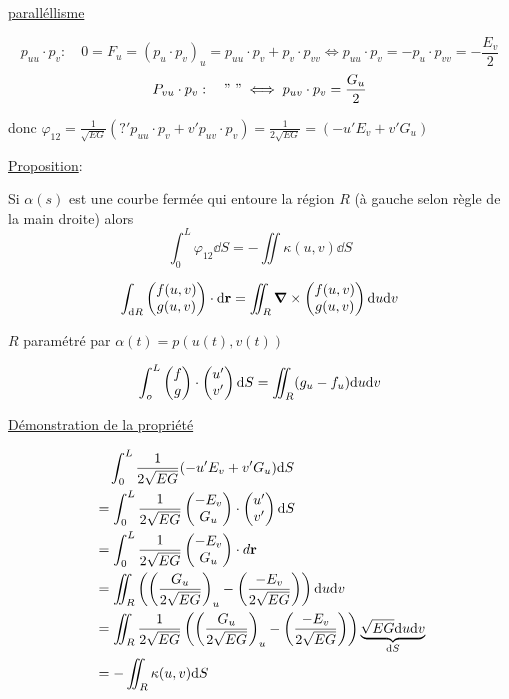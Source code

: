 \underline{paralléllisme}

$$p_{uu} \cdot p_{v}: \quad 0 = F_u = (p_u \cdot  p_{v})_u = p_{uu} \cdot p_v + p_v \cdot p_{vv} \iff p_{uu} \cdot p_v = -p_u \cdot  p_{vv} = - \frac{E_v}{2}  $$ 
$$P_{vu} \cdot p_v : \quad " \ " \iff p_{uv} \cdot p_v = \frac{G_u}{2} $$ 

donc $\varphi_{12} = \frac{1}{\sqrt{EG}} \left( ?' p_{uu} \cdot p_v + v' p_{uv} \cdot p_v   \right) = \frac{1}{2\sqrt{EG}} = (-u'E_v + v' G_u ) $ 

\underline{Proposition}: 

Si $\alpha(s)$ est une courbe fermée qui entoure la région $R$ (à gauche selon règle de la main droite) alors $$\int_0^L \varphi_{12} \dd S = - \iint \kappa (u,v) \dd S$$  

\begin{tcolorbox}[title=Rappel: Théroème de G??]
	$$\int_{\dd{}R} \begin{pmatrix} f(u,v) \\ g(u,v) \end{pmatrix} \cdot  \dd \vb{r} =\iint_R \grad \times  \begin{pmatrix} f(u,v) \\ g(u,v)  \end{pmatrix}\dd u \dd v$$ 
\end{tcolorbox}


$R$ paramétré par $\alpha(t) = p(u(t),v(t))$

$$\int_o^L \begin{pmatrix} f\\g \end{pmatrix} \cdot  \begin{pmatrix} u' \\ v' \end{pmatrix} \dd S = \iint_R (g_u -f_{u}) \dd u\dd v $$ 

\underline{Démonstration de la propriété} 

\begin{align*}
	&\quad \int_0^L \frac{1}{2\sqrt{EG}} (-u' E_v + v' G_{u}) \dd S \\
	&= \int_0^L \frac{1}{2\sqrt{EG}} \begin{pmatrix} -E_v \\G_u \end{pmatrix} \cdot \begin{pmatrix} u' \\ v' \end{pmatrix} \dd S \\ 
	&= \int_0^L \frac{1}{2\sqrt{EG}} \begin{pmatrix} -E_v \\ G_u \end{pmatrix} \cdot d \vb{r} \\
	&= \iint_R \left( \left( \frac{G_u}{2\sqrt{EG}}  \right)_u - \left( \frac{-E_v}{2\sqrt{EG}} \right)   \right) \dd u \dd v \\
	&= \iint_R \frac{1}{2\sqrt{EG}}  \left( \left( \frac{G_u}{2\sqrt{EG}}  \right)_u - \left( \frac{-E_v}{2\sqrt{EG}} \right)   \right) \underbrace{\sqrt{EG} \dd u \dd v}_{\dd S}  \\
	&= - \iint_R \kappa(u,v) \dd S \\
\end{align*}

